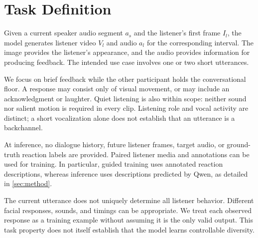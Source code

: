 \section{Task Definition}
\label{sec:task}
Given a current speaker audio segment $a_s$ and the listener's first frame $I_l$, the model generates listener video $V_l$ and audio $a_l$ for the corresponding interval. The image provides the listener's appearance, and the audio provides information for producing feedback. The intended use case involves one or two short utterances.

We focus on brief feedback while the other participant holds the conversational floor. A response may consist only of visual movement, or may include an acknowledgment or laughter. Quiet listening is also within scope: neither sound nor salient motion is required in every clip. Listening role and vocal activity are distinct; a short vocalization alone does not establish that an utterance is a backchannel.

At inference, no dialogue history, future listener frames, target audio, or ground-truth reaction labels are provided. Paired listener media and annotations can be used for training. In particular, guided training uses annotated reaction descriptions, whereas inference uses descriptions predicted by Qwen, as detailed in \cref{sec:method}.

The current utterance does not uniquely determine all listener behavior. Different facial responses, sounds, and timings can be appropriate. We treat each observed response as a training example without assuming it is the only valid output. This task property does not itself establish that the model learns controllable diversity.
